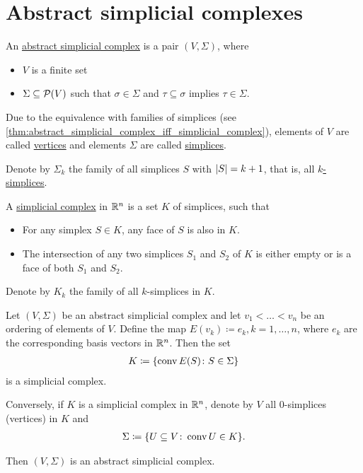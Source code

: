 \section{Abstract simplicial complexes}\label{sec:abstract_simplicial_complexes}

\begin{definition}\label{def:abstract_simplicial_complex}\cite[definition 2.1]{Carlsson2009}
  An \uline{abstract simplicial complex} is a pair $(V, \Sigma)$, where
  \begin{itemize}
    \item $V$ is a finite set
    \item $\Sigma \subseteq \operatorname{\mathcal P}(V)$ such that $\sigma \in \Sigma$ and $\tau \subseteq \sigma$ implies $\tau \in \Sigma$.
  \end{itemize}

  Due to the equivalence with families of simplices (see \cref{thm:abstract_simplicial_complex_iff_simplicial_complex}), elements of $V$ are called \uline{vertices} and elements $\Sigma$ are called \uline{simplices}.

  Denote by $\Sigma_k$ the family of all simplices $S$ with $\left\vert S \right\vert = k + 1$, that is, all \uline{$k$-simplices}.
\end{definition}

\begin{definition}\label{def:simplicial_complex}
  A \uline{simplicial complex} in $\mathbb R^n$ is a set $K$ of simplices, such that
  \begin{itemize}
    \item For any simplex $S \in K$, any face of $S$ is also in $K$.
    \item The intersection of any two simplices $S_1$ and $S_2$ of $K$ is either empty or is a face of both $S_1$ and $S_2$.
  \end{itemize}

  Denote by $K_k$ the family of all $k$-simplices in $K$.
\end{definition}

\begin{proposition}\label{thm:abstract_simplicial_complex_iff_simplicial_complex}
  Let $(V, \Sigma)$ be an abstract simplicial complex and let $v_1 < \ldots < v_n$ be an ordering of elements of $V$. Define the map $E(v_k) \coloneqq e_k, k = 1, \ldots, n$, where $e_k$ are the corresponding basis vectors in $\mathbb R^n$. Then the set
  \begin{align*}
    K \coloneqq \{ \operatorname{conv} E(S) \colon S \in \Sigma \}
  \end{align*}
  is a simplicial complex.

  Conversely, if $K$ is a simplicial complex in $\mathbb R^n$, denote by $V$ all $0$-simplices (vertices) in $K$ and
  \begin{align*}
    \Sigma \coloneqq \{ U \subseteq V \colon \operatorname{conv} U \in K \}.
  \end{align*}

  Then $(V, \Sigma)$ is an abstract simplicial complex.
\end{proposition}

